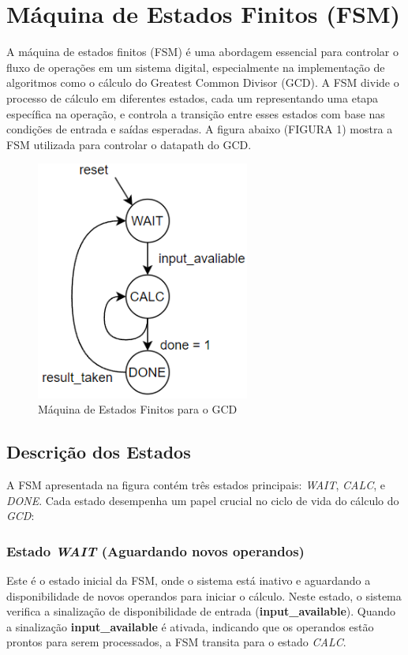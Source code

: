\documentclass[a4paper,11pt]{article} %
\begin{document}
\section{Máquina de Estados Finitos (FSM)}
A máquina de estados finitos (FSM) é uma abordagem essencial
para controlar o fluxo de operações em um sistema digital,
especialmente na implementação de algoritmos como o cálculo
do Greatest Common Divisor (GCD). A FSM divide o processo
de cálculo em diferentes estados, cada um representando uma
etapa específica na operação, e controla a transição entre
esses estados com base nas condições de entrada e saídas
esperadas. A figura abaixo (FIGURA 1) mostra a FSM utilizada para controlar
o datapath do GCD.

\begin{figure}[ht]
    \centering
    \includegraphics[width=7cm,angle=0]{imgs/state_machine_GCD.png}
    \caption{Máquina de Estados Finitos para o GCD}
    \label{fig:fsm}
\end{figure}

\subsection{Descrição dos Estados}
A FSM apresentada na figura contém três estados principais:
\textit{WAIT}, \textit{CALC}, e \textit{DONE}. Cada estado desempenha um papel crucial
no ciclo de vida do cálculo do \textit{GCD}:
\subsubsection{Estado \textit{WAIT} (Aguardando novos operandos)}
Este é o estado inicial da FSM, onde o sistema está inativo e
aguardando a disponibilidade de novos operandos para iniciar o
cálculo. Neste estado, o sistema verifica a sinalização de
disponibilidade de entrada (\textbf{input\_available}). Quando
a sinalização \textbf{input\_available} é ativada, indicando que
os operandos estão prontos para serem processados, a FSM
transita para o estado \textit{CALC}.
\end{document}

